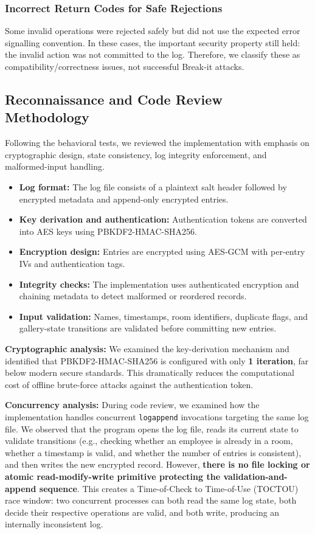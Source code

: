 \documentclass[a4paper, 12pt]{article}
\begin{document}
    \subsubsection{Incorrect Return Codes for Safe Rejections}
    Some invalid operations were rejected safely but did not use the expected error signalling convention. In these cases, the important security property still held: the invalid action was not committed to the log. Therefore, we classify these as compatibility/correctness issues, not successful Break-it attacks.

    \subsection{Reconnaissance and Code Review Methodology}
    Following the behavioral tests, we reviewed the implementation with emphasis on cryptographic design, state consistency, log integrity enforcement, and malformed-input handling.

    \begin{itemize}
        \item \textbf{Log format:} The log file consists of a plaintext salt header followed by encrypted metadata and append-only encrypted entries.
        \item \textbf{Key derivation and authentication:} Authentication tokens are converted into AES keys using PBKDF2-HMAC-SHA256.
        \item \textbf{Encryption design:} Entries are encrypted using AES-GCM with per-entry IVs and authentication tags.
        \item \textbf{Integrity checks:} The implementation uses authenticated encryption and chaining metadata to detect malformed or reordered records.
        \item \textbf{Input validation:} Names, timestamps, room identifiers, duplicate flags, and gallery-state transitions are validated before committing new entries.
    \end{itemize}

    \textbf{Cryptographic analysis:} We examined the key-derivation mechanism and identified that PBKDF2-HMAC-SHA256 is configured with only \textbf{1 iteration}, far below modern secure standards. This dramatically reduces the computational cost of offline brute-force attacks against the authentication token.

    \textbf{Concurrency analysis:} During code review, we examined how the implementation handles concurrent \texttt{logappend} invocations targeting the same log file. We observed that the program opens the log file, reads its current state to validate transitions (e.g., checking whether an employee is already in a room, whether a timestamp is valid, and whether the number of entries is consistent), and then writes the new encrypted record. However, \textbf{there is no file locking or atomic read-modify-write primitive protecting the validation-and-append sequence}. This creates a Time-of-Check to Time-of-Use (TOCTOU) race window: two concurrent processes can both read the same log state, both decide their respective operations are valid, and both write, producing an internally inconsistent log.
\end{document}
